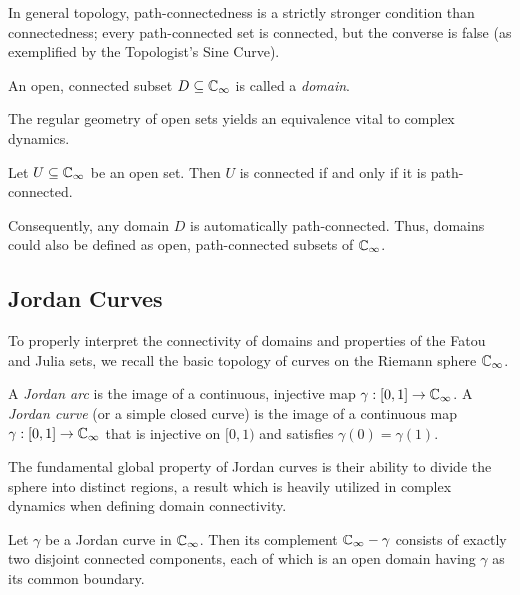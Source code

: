 In general topology, path-connectedness is a strictly stronger condition than
connectedness; every path-connected set is connected, but the converse is false
(as exemplified by the Topologist's Sine Curve).

\begin{definition*}[Domain]
    An open, connected subset $D \subseteq \mathbb{C}_\infty$ is called a \emph{domain}.
\end{definition*}

The regular geometry of open sets yields an equivalence vital to complex
dynamics.

\begin{theorem*}
    Let $U \subseteq \mathbb{C}_\infty$ be an open set. Then $U$ is connected if and only if
    it is path-connected.
\end{theorem*}

Consequently, any domain $D$ is automatically path-connected. Thus, domains
could also be defined as open, path-connected subsets of $\mathbb{C}_\infty$.

\subsection*{Jordan Curves}

To properly interpret the connectivity of domains and properties of the Fatou
and Julia sets, we recall the basic topology of curves on the Riemann sphere
$\mathbb{C}_\infty$.

\begin{definition*}
    A \emph{Jordan arc} is the image of a continuous, injective map $\gamma: [0,
    1] \to \mathbb{C}_\infty$. A \emph{Jordan curve} (or a simple closed curve) is the image
    of a continuous map $\gamma: [0, 1] \to \mathbb{C}_\infty$ that is injective on $[0, 1)$
    and satisfies $\gamma(0) = \gamma(1)$.
\end{definition*}

The fundamental global property of Jordan curves is their ability to divide the
sphere into distinct regions, a result which is heavily utilized in complex
dynamics when defining domain connectivity.

\begin{theorem*}
    \label{thm:jordan_curve_theorem}
    Let $\gamma$ be a Jordan curve in $\mathbb{C}_\infty$. Then its complement $\mathbb{C}_\infty -
    \gamma$ consists of exactly two disjoint connected components, each of which
    is an open domain having $\gamma$ as its common boundary.
\end{theorem*}

